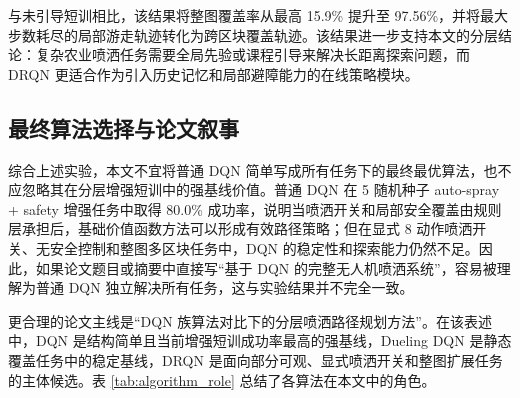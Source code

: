 \documentclass[UTF8]{ctexart}
\begin{document}
与未引导短训相比，该结果将整图覆盖率从最高 15.9\% 提升至 97.56\%，并将最大步数耗尽的局部游走轨迹转化为跨区块覆盖轨迹。该结果进一步支持本文的分层结论：复杂农业喷洒任务需要全局先验或课程引导来解决长距离探索问题，而 DRQN 更适合作为引入历史记忆和局部避障能力的在线策略模块。

\subsection{最终算法选择与论文叙事}

综合上述实验，本文不宜将普通 DQN 简单写成所有任务下的最终最优算法，也不应忽略其在分层增强短训中的强基线价值。普通 DQN 在 5 随机种子 auto-spray + safety 增强任务中取得 80.0\% 成功率，说明当喷洒开关和局部安全覆盖由规则层承担后，基础价值函数方法可以形成有效路径策略；但在显式 8 动作喷洒开关、无安全控制和整图多区块任务中，DQN 的稳定性和探索能力仍然不足。因此，如果论文题目或摘要中直接写“基于 DQN 的完整无人机喷洒系统”，容易被理解为普通 DQN 独立解决所有任务，这与实验结果并不完全一致。

更合理的论文主线是“DQN 族算法对比下的分层喷洒路径规划方法”。在该表述中，DQN 是结构简单且当前增强短训成功率最高的强基线，Dueling DQN 是静态覆盖任务中的稳定基线，DRQN 是面向部分可观、显式喷洒开关和整图扩展任务的主体候选。表 \ref{tab:algorithm_role} 总结了各算法在本文中的角色。

\begin{table}[H]
\centering
\caption{本文中不同强化学习算法的角色定位}
\label{tab:algorithm_role}
\end{table}
\end{document}
